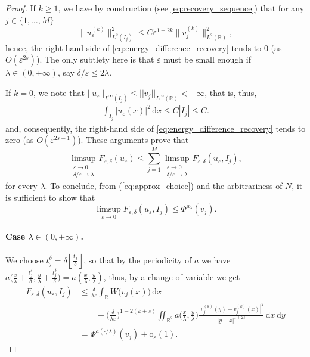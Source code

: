 \documentclass{article}
\theoremstyle{definition}
\newcommand{\mr}{\mathrm}
\newcommand{\de}{\mathrm{d}}
\newcommand{\R}{\mathbb{R}}
\newcommand{\e}{\varepsilon}
\newcommand{\del}{\delta}
\def\e{\varepsilon}
\begin{document}
\begin{proof}
If $k\geq 1$, we have by construction (see \eqref{eq:recovery_sequence}) that for any $j\in\{1,\dots, M\}$
\[\|u_\e^{(k)}\|^2_{L^2(I_j)} \leq C \e^{1-2k}\|v_j^{(k)}\|^2_{L^2(\R)},\] 
hence, the right-hand side of \eqref{eq:energy_difference_recovery} tends to 0 (as $O(\e^{2s})$). The only subtlety here is that $\e$ must be small enough if $\lambda \in (0,+\infty)$, say $\delta/\e \leq 2\lambda$.
    
If $k=0$, we note that $||u_\e||_{L^\infty(I_j)}\leq ||v_j||_{L^\infty(\R)}<+\infty$, that is, thus,
\[
\begin{split}
    \int_{I_j}|u_\e(x)|^2\,\de x \leq C |I_j|\leq C.
\end{split}
\]
and, consequently, the right-hand side of \eqref{eq:energy_difference_recovery} tends to zero (as $O(\e^{2s-1})$). These arguments prove that
    \[\limsup_{\substack{\e\to 0 \\ \del/\e\to\lambda}} F_{\e,\delta}(u_\e) \leq \sum_{j=1}^M
   \limsup_{\substack{\e\to 0 \\ \del/\e\to\lambda}}F_{\e,\delta}(u_\e,I_j),\]
   for every $\lambda$. To conclude, from (\ref{eq:approx_choice}) and the arbitrariness of $N$, it is sufficient to show that $$\limsup_{\e \rightarrow 0} F_{\e,\delta}(u_\e, I_j) \leq \Phi^{a_\lambda}(v_j).$$ 


    
    \paragraph{Case $\lambda\in (0,+\infty)$.}  We choose  $t_j^\delta = \delta \left\lfloor\frac{t_j}{\delta}\right\rfloor$, so that by the periodicity of $a$ we have $a\Big( \frac{x}{\lambda}+\frac{t^\delta_j}{\del}, \frac{y}{\lambda}+\frac{t^\delta_j}{\del}\Big) = a\left( \frac{x}{\lambda}, \frac{y}{\lambda}\right)$, thus, by a change of variable we get
    \begin{equation*}
      \begin{split}
             F_{\e,\delta}(u_\e, I_j)
             &\le\frac{\del}{\lambda\e}\int_\R W\big(v_j(  x)\big) \,\de  x\\
               &\qquad +\Big(\frac{\del}{\lambda\e}\Big)^{1-2(k+s)}\iint_{\R^2}a\Big( \frac{x}{\lambda}, \frac{y}{\lambda}\Big)\frac{|v_{j}^{(k)}(  y)-v^{(k)}_{j}( x)|^2}{|y-x|^{1+2s}} \,\de x\,\de y\\
                   &=\Phi^{a(\cdot/\lambda)}(v_j)+\mr o_\e(1).
      \end{split}
    \end{equation*}

\end{proof}
\end{document}
